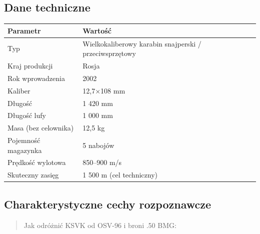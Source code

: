 \documentclass[12pt,oneside]{book}
\begin{document}
\subsection{Dane techniczne}\label{dane-techniczne-80}

\begin{longtable}[]{@{}ll@{}}
\toprule\noalign{}
Parametr & Wartość \\
\midrule\noalign{}
\endhead
\bottomrule\noalign{}
\endlastfoot
Typ & Wielkokaliberowy karabin snajperski / przeciwsprzętowy \\
Kraj produkcji & Rosja \\
Rok wprowadzenia & 2002 \\
Kaliber & 12,7×108 mm \\
Długość & 1 420 mm \\
Długość lufy & 1 000 mm \\
Masa (bez celownika) & 12,5 kg \\
Pojemność magazynka & 5 nabojów \\
Prędkość wylotowa & 850--900 m/s \\
Skuteczny zasięg & 1 500 m (cel techniczny) \\
\end{longtable}

\subsection{Charakterystyczne cechy
rozpoznawcze}\label{charakterystyczne-cechy-rozpoznawcze-80}

\begin{quote}
Jak odróżnić KSVK od OSV-96 i broni .50 BMG:
\end{quote}
\end{document}
